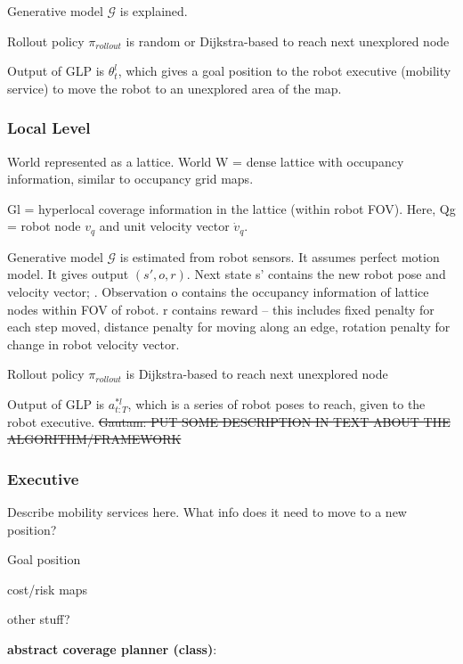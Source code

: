 \documentclass{article}
\newcommand{\ph}[1]{{\textbf{#1}:}} %
\newcommand{\gautam}[1]{{\color{cyan}Gautam: #1 }}
\begin{document}
Generative model $\mathcal{G}$ is explained.

Rollout policy $\pi_{rollout}$ is random or Dijkstra-based to reach next unexplored node

Output of GLP is $\theta^l_t$, which gives a goal position to the robot executive (mobility service) to move the robot to an unexplored area of the map.

\subsubsection{Local Level}
World represented as a lattice. World W = dense lattice with occupancy information, similar to occupancy grid maps.

Gl = hyperlocal coverage information in the lattice (within robot FOV). Here, Qg = robot node $v_q$  and unit velocity vector $\dot{v}_q$. 

Generative model $\mathcal{G}$ is estimated from robot sensors. It assumes perfect motion model. It gives output $(s', o, r)$. Next state s' contains the new robot pose and velocity vector; . Observation o contains the occupancy information of lattice nodes within FOV of robot. r contains reward -- this includes fixed penalty for each step moved, distance penalty for moving along an edge, rotation penalty for change in robot velocity vector.

Rollout policy $\pi_{rollout}$ is Dijkstra-based to reach next unexplored node

Output of GLP is $a^{*l}_{t:T}$, which is a series of robot poses to reach, given to the robot executive.
\sout{\gautam{PUT SOME DESCRIPTION IN TEXT ABOUT THE ALGORITHM/FRAMEWORK}}

\subsubsection{Executive}
Describe mobility services here. What info does it need to move to a new position?

Goal position

cost/risk maps

other stuff?










\ph{abstract coverage planner (class)}
\end{document}
